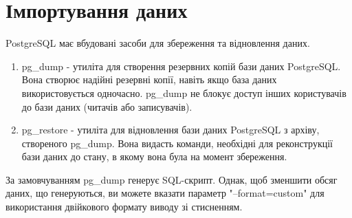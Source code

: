 \section{Імпортування даних}

PostgreSQL має вбудовані засоби для збереження та відновлення даних.

\begin{enumerate}
	\item pg\_dump - утиліта для створення резервних копій бази даних PostgreSQL.
	      Вона створює надійні резервні копії, навіть якщо база даних використовується одночасно.
	      pg\_dump не блокує доступ інших користувачів до бази даних (читачів або записувачів).
	\item pg\_restore - утиліта для відновлення бази даних PostgreSQL з архіву, створеного pg\_dump.
	      Вона видасть команди, необхідні для реконструкції бази даних до стану, в якому вона була
	      на момент збереження.
\end{enumerate}

За замовчуванням pg\_dump генерує SQL-скрипт. Однак, щоб зменшити обсяг даних, що генеруються,
ви можете вказати параметр "--format=custom" для використання двійкового формату виводу зі стисненням.

